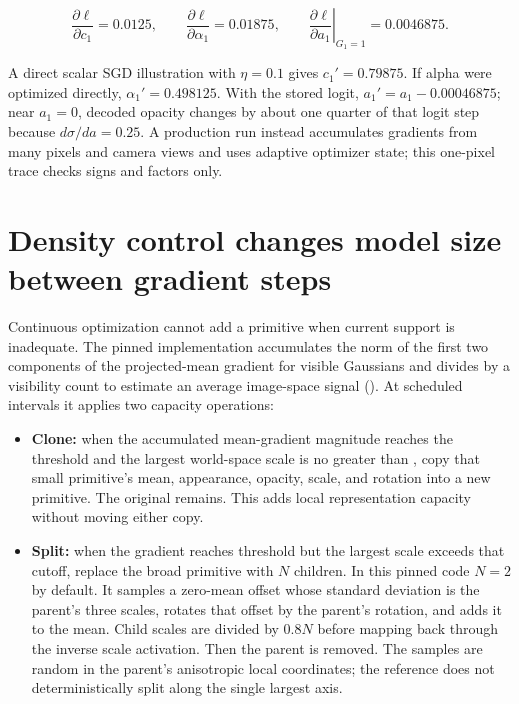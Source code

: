 \[
\frac{\partial\ell}{\partial c_1}=0.0125,\qquad
\frac{\partial\ell}{\partial\alpha_1}=0.01875,\qquad
\left.\frac{\partial\ell}{\partial a_1}\right|_{G_1=1}=0.0046875.
\]

A direct scalar SGD illustration with \(\eta=0.1\) gives \(c_1'=0.79875\). If alpha were optimized directly, \(\alpha_1'=0.498125\). With the stored logit, \(a_1'=a_1-0.00046875\); near \(a_1=0\), decoded opacity changes by about one quarter of that logit step because \(d\sigma/da=0.25\). A production run instead accumulates gradients from many pixels and camera views and uses adaptive optimizer state; this one-pixel trace checks signs and factors only.

\section{Density control changes model size between gradient steps}\label{04-visual-computing-ii-ch039-density-control-changes-model-size-between-gradient-steps}

\hypertarget{04-visual-computing-ii-ch039-density-control-changes-model-size-between-gradient-steps}{}

Continuous optimization cannot add a primitive when current support is inadequate. The pinned implementation accumulates the norm of the first two components of the projected-mean gradient for visible Gaussians and divides by a visibility count to estimate an average image-space signal (\href{https://github.com/graphdeco-inria/gaussian-splatting/blob/54c035f7834b564019656c3e3fcc3646292f727d/scene/gaussian_model.py\#L471-L472}{}). At scheduled intervals it applies two capacity operations:

\begin{itemize}
\tightlist
\item
  \textbf{Clone:} when the accumulated mean-gradient magnitude reaches the threshold and the largest world-space scale is no greater than , copy that small primitive's mean, appearance, opacity, scale, and rotation into a new primitive. The original remains. This adds local representation capacity without moving either copy.
\item
  \textbf{Split:} when the gradient reaches threshold but the largest scale exceeds that cutoff, replace the broad primitive with \(N\) children. In this pinned code \(N=2\) by default. It samples a zero-mean offset whose standard deviation is the parent's three scales, rotates that offset by the parent's rotation, and adds it to the mean. Child scales are divided by \(0.8N\) before mapping back through the inverse scale activation. Then the parent is removed. The samples are random in the parent's anisotropic local coordinates; the reference does not deterministically split along the single largest axis.
\end{itemize}


